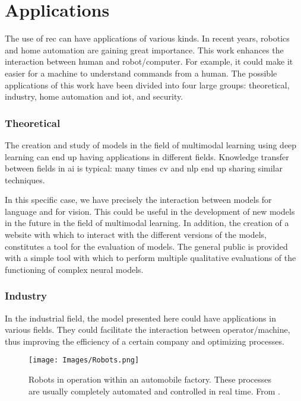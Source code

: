 \section{Applications}\label{sec:applications}

The use of \gls{rec} can have applications of various kinds. In recent years,
robotics and home automation are gaining great importance. This work enhances
the interaction between human and robot/computer. For example, it could make it
easier for a machine to understand commands from a human. The possible
applications of this work have been divided into four large groups:
theoretical, industry, home automation and \acs{iot}, and security.

\subsubsection{Theoretical}

The creation and study of models in the field of multimodal
learning using deep learning can end up having
applications in different fields. Knowledge transfer between fields in \gls{ai}
is typical: many times \gls{cv} and \gls{nlp} end up sharing similar
techniques.

In this specific case, we have precisely the interaction between models for
language and for vision. This could be useful in the development of new models
in the future in the field of multimodal
learning. In addition, the creation of a website
with which to interact with the different versions of the models, constitutes a
tool for the evaluation of models. The general public is provided with a simple
tool with which to perform multiple qualitative evaluations of the functioning
of complex neural models.

\subsubsection{Industry}

In the industrial field, the model presented here could have applications in
various fields. They could facilitate the interaction between operator/machine,
thus improving the efficiency of a certain company and optimizing processes.

\begin{figure}[ht]
  \centering
  \texttt{[image: Images/Robots.png]}
  \caption[Robots in automobile factory]{Robots in operation within an
    automobile factory. These processes are usually completely automated and
    controlled in real time. From
    .}%
  \label{fig:robots}
\end{figure}

